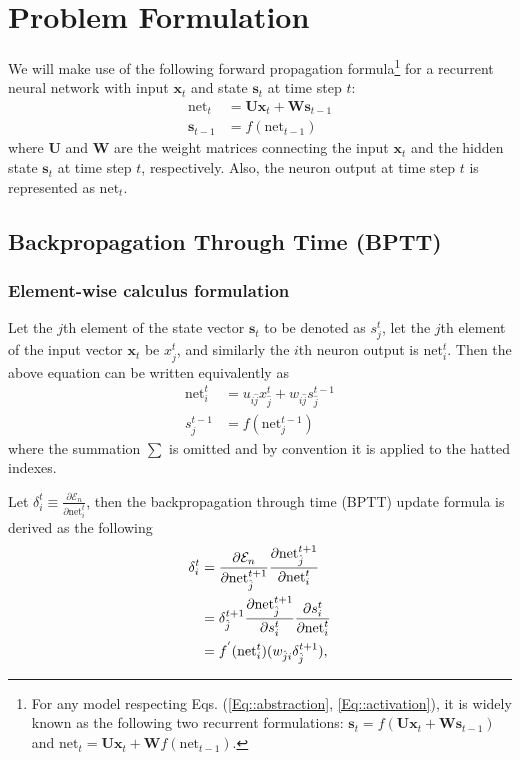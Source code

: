 \documentclass[a4paper, 12pt]{report}
\begin{document}
\section{Problem Formulation}
We will make use of the following forward propagation formula\footnote{For any model respecting Eqs. (\ref{Eq::abstraction}, \ref{Eq::activation}), it is widely known as the following two recurrent formulations: $\bm{s}_t = f(\textbf{U} \bm{x}_t + \textbf{W} \bm{s}_{t-1})$ and $\mathrm{net}_t = \textbf{U}\bm{x}_t + \textbf{W} f(\textrm{net}_{t-1})$.} for a recurrent neural network with input $\bm{x}_t$ and state $\bm{s}_t$ at time step $t$: 
\begin{align}
\mathrm{net}_t &= \textbf{U} \bm{x}_t + \textbf{W} \bm{s}_{t-1}  \label{Eq::abstraction} \\
\bm{s}_{t-1} &= f(\mathrm{net}_{t-1}) \label{Eq::activation}
\end{align}
where $\textbf{U}$ and $\textbf{W}$ are the weight matrices connecting the input  $\bm{x}_t$ and the hidden state $\bm{s}_t$ at time step $t$, respectively. 
Also, the neuron output at time step $t$ is represented as $\mathrm{net}_t$.

\subsection{Backpropagation Through Time (BPTT)}
\subsubsection{Element-wise calculus formulation}
Let the $j$th element of the state vector $\bm{s}_t$ to be denoted as $s_{j}^t$, let the $j$th element of the input vector $\bm{x}_t$ be $x_j^{t}$, and similarly the $i$th neuron output is $\mathrm{net}^t_{i}$.
Then the above equation can be written equivalently as
\begin{align}
\mathrm{net}^t_{i} &= u_{i\hat{j}} x^t_{\hat{j}}+ w_{i\hat{j}} s^{t-1}_{\hat{j}} \\
s^{t-1}_j &= f(\mathrm{net}^{t-1}_j)
\end{align}
where the summation $\sum$ is omitted and  by convention it is applied to the hatted indexes.

Let $\delta_{i}^t \equiv \frac{\partial{\mathcal{E}_n}}{\partial{\mathrm{net}_i^t}}$, then the backpropagation through time (BPTT) update formula is derived as the following
\begin{align}
	\delta_i^t &= \frac{\partial{\mathcal{E}_n}}{\partial{\mathrm{net}_{\hat{j}}^{t+1}}} \frac{\partial {\mathrm{net}_{\hat{j}}^{t+1}}}{\partial {\mathrm{net}_i^{t}}} \notag \\
	&= \delta_{\hat{j}}^{t+1} \frac{\partial {\mathrm{net}_{\hat{j}}^{t+1}}}{\partial{s^t_{i}}}  \frac{\partial{s^t_i}} {\partial {\mathrm{net}_i^{t}}} \notag \\
	&= f^{'}(\mathrm{net}^{t}_{i}) ( w_{\hat{j}i} \delta_{\hat{j}}^{t+1}),
\end{align}
\end{document}
